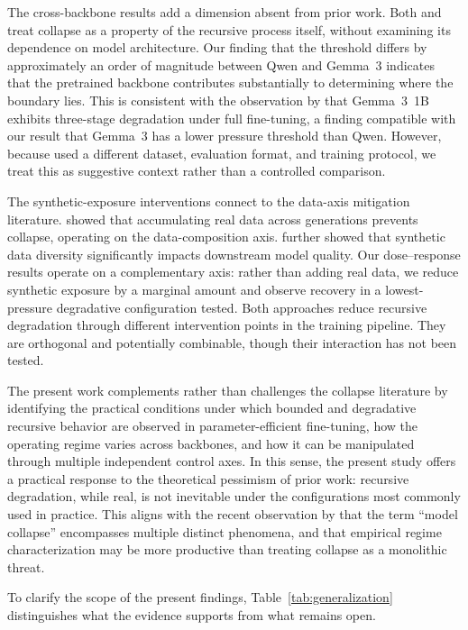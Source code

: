 \documentclass[a4paper,fleqn]{cas-dc}
\newif\ifshowchanges
\newcommand{\rev}[1]{\ifshowchanges{\color{blue}#1}\else{#1}\fi}
\begin{document}
The cross-backbone results add a dimension absent from prior work. Both
\citet{shumailov2024} and \citet{dohmatob2025} treat collapse as a property of
the recursive process itself, without examining its dependence on model
architecture. Our finding that the threshold differs by approximately an order
of magnitude between Qwen and Gemma~3 indicates that the pretrained backbone
contributes substantially to determining where the boundary lies. This
is consistent with the observation by \citet{keisha2025} that Gemma~3~1B
exhibits three-stage degradation under full fine-tuning, a finding compatible
with our result that Gemma~3 has a lower pressure threshold than Qwen. However,
because \citet{keisha2025} used a different dataset, evaluation format, and
training protocol, we treat this as suggestive context rather than a controlled
comparison.

The synthetic-exposure interventions connect to the data-axis mitigation
literature. \citet{gerstgrasser2024} showed that accumulating real data across
generations prevents collapse, operating on the data-composition axis.
\citet{wang2024diversity} further showed that synthetic data diversity
significantly impacts downstream model quality. Our
\rev{dose--response results} operate on a complementary axis: rather than adding real data, we
reduce synthetic exposure by a marginal amount and observe recovery in a
\rev{lowest-pressure degradative configuration tested}. Both approaches reduce recursive degradation through
different intervention points in the training pipeline. They are orthogonal and
potentially combinable, though their interaction has not been tested.

The present work complements rather than challenges the collapse literature by
identifying the practical conditions under which bounded and degradative
recursive behavior are observed in parameter-efficient fine-tuning, how the
operating regime varies across backbones, and how it can be manipulated through
multiple independent control axes. In this sense, the present study offers a
practical response to the theoretical pessimism of prior work: recursive
degradation, while real, is not inevitable under the configurations most
commonly used in practice. This aligns with the recent observation by
\citet{schaeffer2025position} that the term ``model collapse'' encompasses
multiple distinct phenomena, and that empirical regime characterization may be
more productive than treating collapse as a monolithic threat.

To clarify the scope of the present findings, Table~\ref{tab:generalization}
distinguishes what the evidence supports from what remains open.
\end{document}
